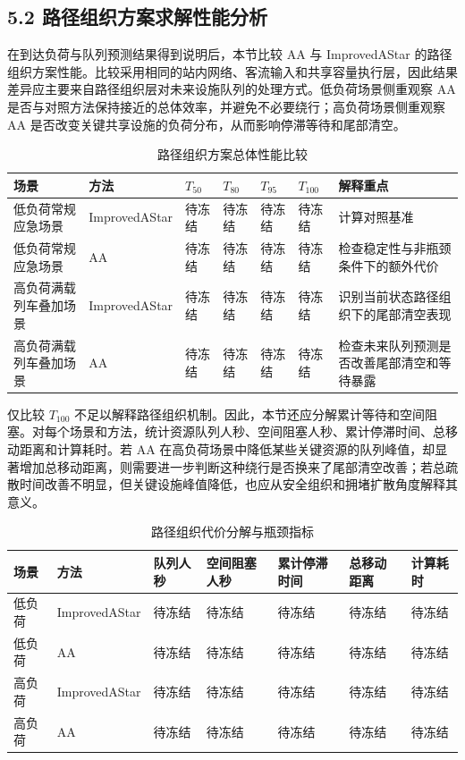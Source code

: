 \documentclass[UTF8,a4paper,12pt]{ctexart}
\begin{document}
\subsection{5.2 路径组织方案求解性能分析}

在到达负荷与队列预测结果得到说明后，本节比较 AA 与 ImprovedAStar 的路径组织方案性能。比较采用相同的站内网络、客流输入和共享容量执行层，因此结果差异应主要来自路径组织层对未来设施队列的处理方式。低负荷场景侧重观察 AA 是否与对照方法保持接近的总体效率，并避免不必要绕行；高负荷场景侧重观察 AA 是否改变关键共享设施的负荷分布，从而影响停滞等待和尾部清空。

\begin{table}[htbp]
\centering
\caption{路径组织方案总体性能比较}
\small
\begin{tabular}{p{}p{}p{}p{}p{}p{}p{}}
\toprule
场景 & 方法 & \(T_{50}\) & \(T_{80}\) & \(T_{95}\) & \(T_{100}\) & 解释重点 \\
\midrule
低负荷常规应急场景 & ImprovedAStar & 待冻结 & 待冻结 & 待冻结 & 待冻结 & 计算对照基准 \\
低负荷常规应急场景 & AA & 待冻结 & 待冻结 & 待冻结 & 待冻结 & 检查稳定性与非瓶颈条件下的额外代价 \\
高负荷满载列车叠加场景 & ImprovedAStar & 待冻结 & 待冻结 & 待冻结 & 待冻结 & 识别当前状态路径组织下的尾部清空表现 \\
高负荷满载列车叠加场景 & AA & 待冻结 & 待冻结 & 待冻结 & 待冻结 & 检查未来队列预测是否改善尾部清空和等待暴露 \\
\bottomrule
\end{tabular}
\end{table}

仅比较 \(T_{100}\) 不足以解释路径组织机制。因此，本节还应分解累计等待和空间阻塞。对每个场景和方法，统计资源队列人秒、空间阻塞人秒、累计停滞时间、总移动距离和计算耗时。若 AA 在高负荷场景中降低某些关键资源的队列峰值，却显著增加总移动距离，则需要进一步判断这种绕行是否换来了尾部清空改善；若总疏散时间改善不明显，但关键设施峰值降低，也应从安全组织和拥堵扩散角度解释其意义。

\begin{table}[htbp]
\centering
\caption{路径组织代价分解与瓶颈指标}
\small
\begin{tabular}{p{}p{}p{}p{}p{}p{}p{}}
\toprule
场景 & 方法 & 队列人秒 & 空间阻塞人秒 & 累计停滞时间 & 总移动距离 & 计算耗时 \\
\midrule
低负荷 & ImprovedAStar & 待冻结 & 待冻结 & 待冻结 & 待冻结 & 待冻结 \\
低负荷 & AA & 待冻结 & 待冻结 & 待冻结 & 待冻结 & 待冻结 \\
高负荷 & ImprovedAStar & 待冻结 & 待冻结 & 待冻结 & 待冻结 & 待冻结 \\
高负荷 & AA & 待冻结 & 待冻结 & 待冻结 & 待冻结 & 待冻结 \\
\bottomrule
\end{tabular}
\end{table}
\end{document}
